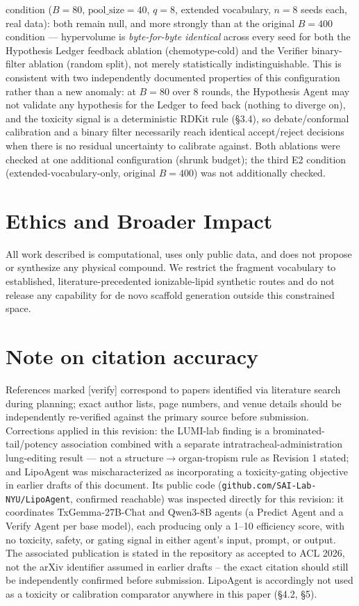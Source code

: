 \documentclass{article}
\begin{document}
condition ($B=80$, $\text{pool\_size}=40$, $q=8$, extended vocabulary,
$n=8$ seeds each, real data): both remain null, and more strongly than
at the original $B=400$ condition --- hypervolume is \emph{byte-for-byte
identical} across every seed for both the Hypothesis Ledger feedback
ablation (chemotype-cold) and the Verifier binary-filter ablation
(random split), not merely statistically indistinguishable. This is
consistent with two independently documented properties of this
configuration rather than a new anomaly: at $B=80$ over 8 rounds, the
Hypothesis Agent may not validate any hypothesis for the Ledger to feed
back (nothing to diverge on), and the toxicity signal is a deterministic
RDKit rule (\S3.4), so debate/conformal calibration and a binary filter
necessarily reach identical accept/reject decisions when there is no
residual uncertainty to calibrate against. Both ablations were checked at
one additional configuration (shrunk budget); the third E2 condition
(extended-vocabulary-only, original $B=400$) was not additionally
checked.

\section*{Ethics and Broader Impact}

All work described is computational, uses only public data, and does not
propose or synthesize any physical compound. We restrict the fragment
vocabulary to established, literature-precedented ionizable-lipid
synthetic routes and do not release any capability for de novo scaffold
generation outside this constrained space.

\section*{Note on citation accuracy}

References marked [verify] correspond to papers identified via literature
search during planning; exact author lists, page numbers, and venue
details should be independently re-verified against the primary source
before submission. Corrections applied in this revision: the LUMI-lab
finding is a brominated-tail/potency association combined with a separate
intratracheal-administration lung-editing result --- not a
structure$\to$organ-tropism rule as Revision 1 stated; and LipoAgent
\citep{li2025lipoagent} was mischaracterized as incorporating a
toxicity-gating objective in earlier drafts of this document. Its public
code (\texttt{github.com/SAI-Lab-NYU/LipoAgent}, confirmed reachable) was
inspected directly for this revision: it coordinates TxGemma-27B-Chat and
Qwen3-8B agents (a Predict Agent and a Verify Agent per base model), each
producing only a 1--10 efficiency score, with no toxicity, safety, or
gating signal in either agent's input, prompt, or output. The associated
publication is stated in the repository as accepted to ACL 2026, not the
arXiv identifier assumed in earlier drafts -- the exact citation should
still be independently confirmed before submission. LipoAgent is
accordingly not used as a toxicity or calibration comparator anywhere in
this paper (\S4.2, \S5).
\end{document}
